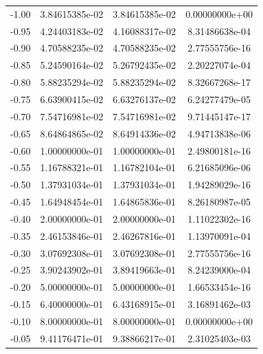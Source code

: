 \documentclass[a4paper]{book}
\begin{document}
\begin{enumerate}
\bigskip
\begin{center}
    \tabletail{\hline}
    \tablelasttail{\hline}
    \begin{supertabular}{|cccc|}
        -1.00 & 3.84615385e-02 & 3.84615385e-02 & 0.00000000e+00 \\
        -0.95 & 4.24403183e-02 & 4.16088317e-02 & 8.31486638e-04 \\
        -0.90 & 4.70588235e-02 & 4.70588235e-02 & 2.77555756e-16 \\
        -0.85 & 5.24590164e-02 & 5.26792435e-02 & 2.20227074e-04 \\
        -0.80 & 5.88235294e-02 & 5.88235294e-02 & 8.32667268e-17 \\
        -0.75 & 6.63900415e-02 & 6.63276137e-02 & 6.24277479e-05 \\
        -0.70 & 7.54716981e-02 & 7.54716981e-02 & 9.71445147e-17 \\
        -0.65 & 8.64864865e-02 & 8.64914336e-02 & 4.94713838e-06 \\
        -0.60 & 1.00000000e-01 & 1.00000000e-01 & 2.49800181e-16 \\
        -0.55 & 1.16788321e-01 & 1.16782104e-01 & 6.21685096e-06 \\
        -0.50 & 1.37931034e-01 & 1.37931034e-01 & 1.94289029e-16 \\
        -0.45 & 1.64948454e-01 & 1.64865836e-01 & 8.26180987e-05 \\
        -0.40 & 2.00000000e-01 & 2.00000000e-01 & 1.11022302e-16 \\
        -0.35 & 2.46153846e-01 & 2.46267816e-01 & 1.13970091e-04 \\
        -0.30 & 3.07692308e-01 & 3.07692308e-01 & 2.77555756e-16 \\
        -0.25 & 3.90243902e-01 & 3.89419663e-01 & 8.24239000e-04 \\
        -0.20 & 5.00000000e-01 & 5.00000000e-01 & 1.66533454e-16 \\
        -0.15 & 6.40000000e-01 & 6.43168915e-01 & 3.16891462e-03 \\
        -0.10 & 8.00000000e-01 & 8.00000000e-01 & 0.00000000e+00 \\
        -0.05 & 9.41176471e-01 & 9.38866217e-01 & 2.31025403e-03 \\

\end{supertabular}
\end{center}
\end{enumerate}
\end{document}
